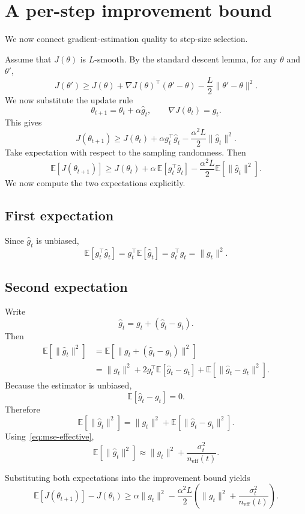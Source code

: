 \documentclass[11pt]{article}
\begin{document}
\section{A per-step improvement bound}

We now connect gradient-estimation quality to step-size selection.

Assume that $J(\theta)$ is $L$-smooth. By the standard descent lemma, for any $\theta$ and $\theta'$,
\[
J(\theta')
\ge
J(\theta)
+
\nabla J(\theta)^\top(\theta'-\theta)
-
\frac{L}{2}\|\theta'-\theta\|^2.
\]
We now substitute the update rule
\[
\theta_{t+1} = \theta_t + \alpha \hat g_t,
\qquad
\nabla J(\theta_t)=g_t.
\]
This gives
\[
J(\theta_{t+1})
\ge
J(\theta_t)
+
\alpha g_t^\top \hat g_t
-
\frac{\alpha^2L}{2}\|\hat g_t\|^2.
\]
Take expectation with respect to the sampling randomness. Then
\[
\mathbb{E}[J(\theta_{t+1})]
\ge
J(\theta_t)
+
\alpha\,\mathbb{E}[g_t^\top \hat g_t]
-
\frac{\alpha^2L}{2}\mathbb{E}[\|\hat g_t\|^2].
\]
We now compute the two expectations explicitly.

\subsection*{First expectation}
Since $\hat g_t$ is unbiased,
\[
\mathbb{E}[g_t^\top \hat g_t]
=
g_t^\top \mathbb{E}[\hat g_t]
=
g_t^\top g_t
=
\|g_t\|^2.
\]

\subsection*{Second expectation}
Write
\[
\hat g_t = g_t + (\hat g_t-g_t).
\]
Then
\begin{align*}
\mathbb{E}[\|\hat g_t\|^2]
&=
\mathbb{E}[\|g_t + (\hat g_t-g_t)\|^2] \\
&=
\|g_t\|^2 + 2g_t^\top \mathbb{E}[\hat g_t-g_t] + \mathbb{E}[\|\hat g_t-g_t\|^2].
\end{align*}
Because the estimator is unbiased,
\[
\mathbb{E}[\hat g_t-g_t]=0.
\]
Therefore
\[
\mathbb{E}[\|\hat g_t\|^2]
=
\|g_t\|^2 + \mathbb{E}[\|\hat g_t-g_t\|^2].
\]
Using~\eqref{eq:mse-effective},
\[
\mathbb{E}[\|\hat g_t\|^2]
\approx
\|g_t\|^2 + \frac{\sigma_t^2}{n_{\mathrm{eff}}(t)}.
\]

Substituting both expectations into the improvement bound yields
\begin{equation}
\mathbb{E}[J(\theta_{t+1})]-J(\theta_t)
\ge
\alpha\|g_t\|^2
-
\frac{\alpha^2L}{2}
\left(
\|g_t\|^2 + \frac{\sigma_t^2}{n_{\mathrm{eff}}(t)}
\right).
\label{eq:main-bound}
\end{equation}
\end{document}
